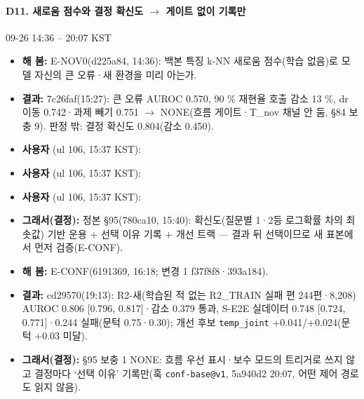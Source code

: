 \paragraph{D11. 새로움 점수와 결정 확신도 $\rightarrow$ 게이트 없이 기록만}
{\small 09-26 14:36 -- 20:07 KST}
\begin{itemize}
  \item \textbf{해 봄:} E-NOV0(d225a84, 14:36): 백본 특징 k-NN 새로움 점수(학습 없음)로 모델 자신의 큰 오류·새 환경을 미리 아는가.
  \item \textbf{결과:} 7c26faf(15:27): 큰 오류 AUROC 0.570, 90 \% 재현율 호출 감소 13 \%, dr 이동 0.742·과제 빼기 0.751 $\rightarrow$ NONE(흐름 게이트·T\_nov 채널 안 둠, §84 보충 9). 판정 밖: 결정 확신도 0.804(감소 0.450).
  \item \textbf{사용자} (ul 106, 15:37 KST): 
  \item \textbf{사용자} (ul 106, 15:37 KST): 
  \item \textbf{사용자} (ul 106, 15:37 KST): 
  \item \textbf{그래서(결정):} 정본 §95(780ca10, 15:40): 확신도(질문별 1·2등 로그확률 차의 최솟값) 기반 운용 + 선택 이유 기록 + 개선 트랙 --- 결과 뒤 선택이므로 새 표본에서 먼저 검증(E-CONF).
  \item \textbf{해 봄:} E-CONF(6191369, 16:18; 변경 1 f37f8f8·393a184).
  \item \textbf{결과:} cd29570(19:13): R2-새(학습된 적 없는 R2\_TRAIN 실패 편 244편·8,208) AUROC 0.806 [0.796, 0.817]·감소 0.379 통과, S-E2E 실데이터 0.748 [0.724, 0.771]·0.244 실패(문턱 0.75·0.30); 개선 후보 \texttt{temp\_\allowbreak{}joint} +0.041/+0.024(문턱 +0.03 미달).
  \item \textbf{그래서(결정):} §95 보충 1 NONE: 흐름 우선 표시·보수 모드의 트리거로 쓰지 않고 결정마다 `선택 이유' 기록만(훅 \texttt{conf-\allowbreak{}base@v1}, 5a940d2 20:07, 어떤 제어 경로도 읽지 않음).
\end{itemize}

